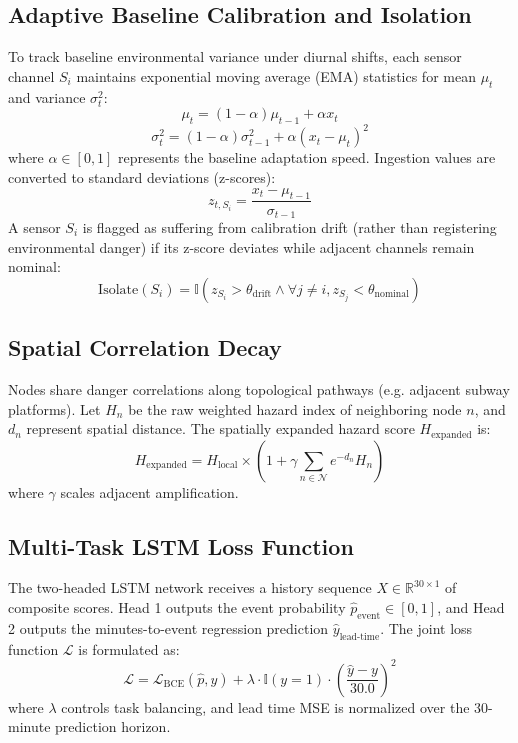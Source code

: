 \documentclass[conference]{IEEEtran}
\begin{document}
\subsection{Adaptive Baseline Calibration and Isolation}
To track baseline environmental variance under diurnal shifts, each sensor channel $S_i$ maintains exponential moving average (EMA) statistics for mean $\mu_t$ and variance $\sigma^2_t$:
\begin{equation}
\mu_t = (1-\alpha)\mu_{t-1} + \alpha x_t
\end{equation}
\begin{equation}
\sigma^2_t = (1-\alpha)\sigma^2_{t-1} + \alpha (x_t - \mu_t)^2
\end{equation}
where $\alpha \in [0, 1]$ represents the baseline adaptation speed. Ingestion values are converted to standard deviations (z-scores):
\begin{equation}
z_{t, S_i} = \frac{x_t - \mu_{t-1}}{\sigma_{t-1}}
\end{equation}
A sensor $S_i$ is flagged as suffering from calibration drift (rather than registering environmental danger) if its z-score deviates while adjacent channels remain nominal:
\begin{equation}
\text{Isolate}(S_i) = \mathbb{I}(z_{S_i} > \theta_{\text{drift}} \land \forall j \neq i, z_{S_j} < \theta_{\text{nominal}})
\end{equation}

\subsection{Spatial Correlation Decay}
Nodes share danger correlations along topological pathways (e.g. adjacent subway platforms). Let $H_n$ be the raw weighted hazard index of neighboring node $n$, and $d_n$ represent spatial distance. The spatially expanded hazard score $H_{\text{expanded}}$ is:
\begin{equation}
H_{\text{expanded}} = H_{\text{local}} \times \left(1 + \gamma \sum_{n \in \mathcal{N}} e^{-d_n} H_n\right)
\end{equation}
where $\gamma$ scales adjacent amplification.

\subsection{Multi-Task LSTM Loss Function}
The two-headed LSTM network receives a history sequence $X \in \mathbb{R}^{30 \times 1}$ of composite scores. Head 1 outputs the event probability $\hat{p}_{\text{event}} \in [0, 1]$, and Head 2 outputs the minutes-to-event regression prediction $\hat{y}_{\text{lead-time}}$. The joint loss function $\mathcal{L}$ is formulated as:
\begin{equation}
\mathcal{L} = \mathcal{L}_{\text{BCE}}(\hat{p}, y) + \lambda \cdot \mathbb{I}(y = 1) \cdot \left(\frac{\hat{y} - y}{30.0}\right)^2
\end{equation}
where $\lambda$ controls task balancing, and lead time MSE is normalized over the 30-minute prediction horizon.
\end{document}
